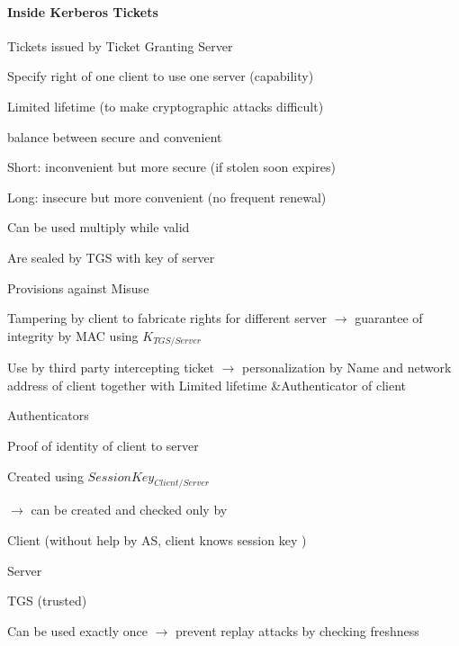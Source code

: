 \documentclass[a4paper]{article}
\begin{document}
\begin{multicols}{3}
    \paragraph{Inside Kerberos Tickets}
    \begin{itemize*}
        \item Tickets issued by Ticket Granting Server
        \item Specify right of one client to use one server (capability)
        \item Limited lifetime (to make cryptographic attacks difficult)
        \begin{itemize*}
            \item balance between secure and convenient
            \item Short: inconvenient but more secure (if stolen soon expires)
            \item Long: insecure but more convenient (no frequent renewal)
        \end{itemize*}
        \item Can be used multiply while valid
        \item Are sealed by TGS with key of server
    \end{itemize*}


    Provisions against Misuse
    \begin{itemize*}
        \item Tampering by client to fabricate rights for different server $\rightarrow$ guarantee of integrity by MAC using $K_{TGS/Server}$
        \item Use by third party intercepting ticket $\rightarrow$ personalization by Name and network address of client together with Limited lifetime \&Authenticator of client
    \end{itemize*}

    Authenticators
    \begin{itemize*}
        \item Proof of identity of client to server
        \item Created using $SessionKey_{Client/Server}$
        \begin{itemize*}
            \item[$\rightarrow$] can be created and checked only by
            \item Client (without help by AS, client knows session key )
            \item Server
            \item TGS (trusted)
        \end{itemize*}
        \item Can be used exactly once $\rightarrow$ prevent replay attacks by checking freshness
    \end{itemize*}


\end{multicols}
\end{document}
